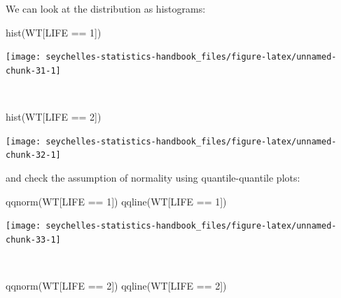 \documentclass[
  12pt,
]{book}
\newenvironment{Shaded}{\begin{snugshade}}{\end{snugshade}}
\newcommand{\DecValTok}[1]{\textcolor[rgb]{0.00,0.00,0.81}{#1}}
\newcommand{\FunctionTok}[1]{\textcolor[rgb]{0.00,0.00,0.00}{#1}}
\newcommand{\NormalTok}[1]{#1}
\newcommand{\SpecialCharTok}[1]{\textcolor[rgb]{0.00,0.00,0.00}{#1}}
\begin{document}
We can look at the distribution as histograms:

\begin{Shaded}
\begin{Highlighting}[]
\FunctionTok{hist}\NormalTok{(WT[LIFE }\SpecialCharTok{==} \DecValTok{1}\NormalTok{])}
\end{Highlighting}
\end{Shaded}

\begin{center}\texttt{[image: seychelles-statistics-handbook\_files/figure-latex/unnamed-chunk-31-1]} \end{center}

~

\begin{Shaded}
\begin{Highlighting}[]
\FunctionTok{hist}\NormalTok{(WT[LIFE }\SpecialCharTok{==} \DecValTok{2}\NormalTok{])}
\end{Highlighting}
\end{Shaded}

\begin{center}\texttt{[image: seychelles-statistics-handbook\_files/figure-latex/unnamed-chunk-32-1]} \end{center}

\newpage

and check the assumption of normality using quantile-quantile plots:

\begin{Shaded}
\begin{Highlighting}[]
\FunctionTok{qqnorm}\NormalTok{(WT[LIFE }\SpecialCharTok{==} \DecValTok{1}\NormalTok{])}
\FunctionTok{qqline}\NormalTok{(WT[LIFE }\SpecialCharTok{==} \DecValTok{1}\NormalTok{])}
\end{Highlighting}
\end{Shaded}

\begin{center}\texttt{[image: seychelles-statistics-handbook\_files/figure-latex/unnamed-chunk-33-1]} \end{center}

~

\begin{Shaded}
\begin{Highlighting}[]
\FunctionTok{qqnorm}\NormalTok{(WT[LIFE }\SpecialCharTok{==} \DecValTok{2}\NormalTok{])}
\FunctionTok{qqline}\NormalTok{(WT[LIFE }\SpecialCharTok{==} \DecValTok{2}\NormalTok{])}
\end{Highlighting}
\end{Shaded}
\end{document}

